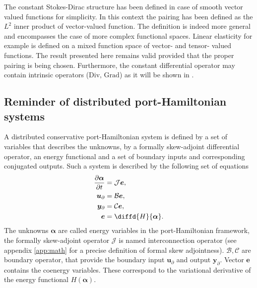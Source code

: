 \begin{remark}
	The constant Stokes-Dirac structure has been defined in case of smooth vector valued functions for simplicity. In this context the pairing has been defined as the $L^2$ inner product of vector-valued function. The definition is indeed more general and encompasses the case of more complex functional spaces. Linear elasticity for example is defined on a mixed function space of vector- and tensor- valued functions. The result presented here remains valid provided that the proper {pairing is being chosen}. Furthermore, the constant differential operator may contain intrinsic operators ($\mathrm{Div}, \, \mathrm{Grad}$) as it will be shown in .
\end{remark}


\subsection{Reminder of distributed port-Hamiltonian systems}

A distributed conservative port-Hamiltonian system is defined by a set of variables that describes the unknowns, by a formally skew-adjoint differential operator, an energy functional and a set of boundary inputs and corresponding conjugated outputs. Such a system is described by the following set of equations
\begin{equation}
\begin{aligned}
\displaystyle \diffp{\bm{\alpha}}{t} &= \mathcal{J}\bm{e}, \vspace{3pt}\\
\bm{u}_\partial &= \mathcal{B} \displaystyle \bm{e}, \vspace{3pt}\\
\bm{y}_\partial &= \mathcal{C} \displaystyle \bm{e}, \vspace{3pt}\\
\bm{e} &= \displaystyle \diffd{H}{\bm{\alpha}}. \\
\end{aligned}
\end{equation}
The unknowns $\bm{\alpha}$ are called energy variables in the port-Hamiltonian framework, the formally skew-adjoint operator $\mathcal{J}$ is named interconnection operator (see appendix \ref{app:math} for a precise definition of formal skew adjointness). $\mathcal{B}, \mathcal{C}$ are boundary operator, that provide the boundary input $\bm{u}_\partial$ and output $\bm{y}_\partial$. Vector $\bm{e}$ contains the coenergy variables. These correspond to the variational derivative of the energy functional  $H(\bm{\alpha})$.

